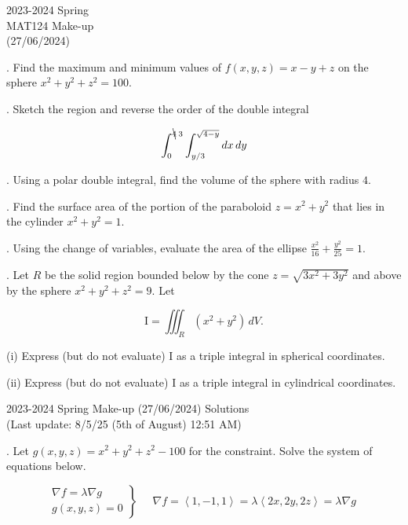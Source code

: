 \documentclass{article}
\begin{document}
\pagestyle{empty}
\large

\begin{center}
2023-2024 Spring \\MAT124 Make-up\\(27/06/2024)
\end{center}

. Find the maximum and minimum values of $f(x,y,z)=x-y+z$ on the sphere $x^2+y^2+z^2=100$.

\hfill

. Sketch the region and reverse the order of the double integral

\[\int_0^{\bcancel4\:3}\int_{y/3}^{\sqrt{4-y}}dx\,dy\]

\hfill

. Using a polar double integral, find the volume of the sphere with radius $4$.

\hfill

. Find the surface area of the portion of the paraboloid $z=x^2+y^2$ that lies in the cylinder $x^2+y^2=1$.

\hfill

. Using the change of variables, evaluate the area of the ellipse $\displaystyle\frac{x^2}{16}+\frac{y^2}{25}=1$.

\hfill

. Let $R$ be the solid region bounded below by the cone $z=\sqrt{3x^2+3y^2}$ and above by the sphere $x^2+y^2+z^2=9$. Let

\[\mathrm{I}=\iiint_R(x^2+y^2)\,dV.\]

\hfill

\noindent (i) Express (but do not evaluate) $\mathrm{I}$ as a triple integral in spherical coordinates.

\hfill

\noindent (ii) Express (but do not evaluate) $\mathrm{I}$ as a triple integral in cylindrical coordinates.

\newpage

\begin{center}
2023-2024 Spring Make-up (27/06/2024) Solutions\\
(Last update: 8/5/25 (5th of August) 12:51 AM)
\end{center}

. Let $g(x,y,z)=x^2+y^2+z^2-100$ for the constraint. Solve the system of equations below.

\[
\left.
\begin{array}{l}
\displaystyle\nabla f=\lambda\nabla g \\
\displaystyle g(x,y,z)=0
\end{array}
\right\}\quad
\begin{array}{c}
\nabla f=\left\langle1,-1,1\right\rangle=\lambda\left\langle2x,2y,2z\right\rangle=\lambda\nabla g
\end{array}
\]
\end{document}
